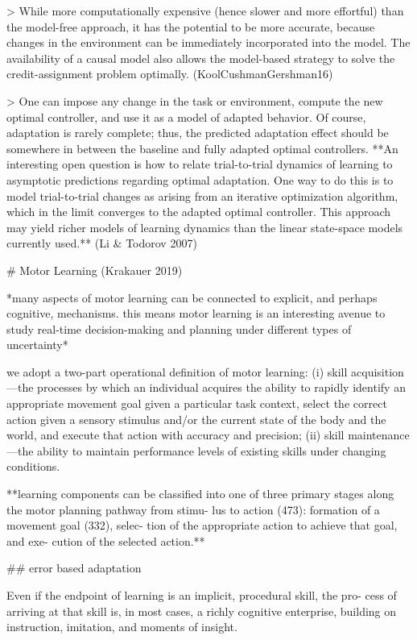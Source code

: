 \documentclass[../main.tex]{subfiles}
\begin{document}
{{> While more computationally expensive (hence slower and more effortful) than the model-free approach, it has the potential to be more accurate, because changes in the environment can be immediately incorporated into the model. The availability of a causal model also allows the model-based strategy to solve the credit-assignment problem optimally. (KoolCushmanGershman16)

> One can impose any change in the task or environment, compute the new optimal controller, and use it as a model of adapted behavior. Of course, adaptation is rarely complete; thus, the predicted adaptation effect should be somewhere in between the baseline and fully adapted optimal controllers. **An interesting open question is how to relate trial-to-trial dynamics of learning to asymptotic predictions regarding optimal adaptation. One way to do this is to model trial-to-trial changes as arising from an iterative optimization algorithm, which in the limit converges to the adapted optimal controller. This approach may yield richer models of learning dynamics than the linear state-space models currently used.** (Li & Todorov 2007)

# Motor Learning (Krakauer 2019)

*many aspects of motor learning can be connected to explicit, and perhaps cognitive, mechanisms. this means motor learning is an interesting avenue to study real-time decision-making and planning under different types of uncertainty*

we adopt a two-part operational definition of motor learning: (i) skill acquisition—the processes by which an individual acquires the ability to rapidly identify an appropriate movement goal given a particular task context, select the correct action given a sensory stimulus and/or the current state of the body and the world, and execute that action with accuracy and precision; (ii) skill maintenance—the ability to maintain performance levels of existing skills under changing conditions.

**learning components can be classified into one of three primary stages along the motor planning pathway from stimu- lus to action (473): formation of a movement goal (332), selec- tion of the appropriate action to achieve that goal, and exe- cution of the selected action.**

## error based adaptation

Even if the endpoint of learning is an implicit, procedural skill, the pro- cess of arriving at that skill is, in most cases, a richly cognitive enterprise, building on instruction, imitation, and moments of insight.

}}
\end{document}
